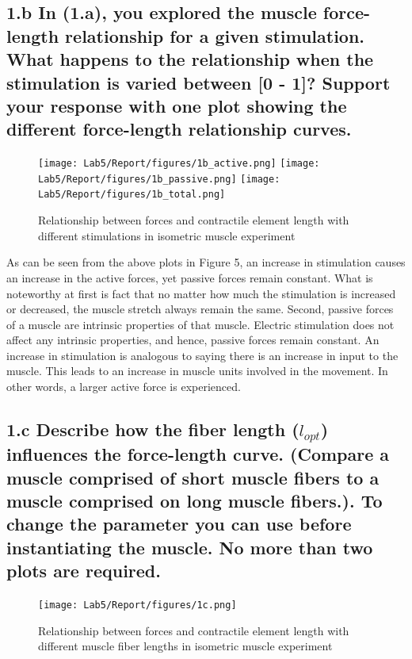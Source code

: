 \documentclass{cmc}
\begin{document}
\subsection*{1.b In (1.a), you explored the muscle force-length
  relationship for a given stimulation. What happens to the
  relationship when the stimulation is varied between [0 - 1]? Support
  your response with one plot showing the different force-length
  relationship curves.}
  \begin{figure}[H]
  \centering 
  \texttt{[image: Lab5/Report/figures/1b\_active.png]}
  \texttt{[image: Lab5/Report/figures/1b\_passive.png]}
  \texttt{[image: Lab5/Report/figures/1b\_total.png]}
  \caption{Relationship between forces and contractile element length with different stimulations in isometric muscle experiment }
  \label{1b}
\end{figure}
  
As can be seen from the above plots in Figure 5, an increase in stimulation causes an increase in the active forces, yet passive forces remain constant. What is noteworthy at first is fact that no matter how much the stimulation is increased or decreased, the muscle stretch always remain the same. Second, passive forces of a muscle are intrinsic properties of that muscle. Electric stimulation does not affect any intrinsic properties, and hence, passive forces remain constant. An increase in stimulation is analogous to saying there is an increase in input to the muscle. This leads to an increase in muscle units involved in the movement. In other words, a larger active force is experienced.  

\subsection*{1.c Describe how the fiber length ($l_{opt}$) influences
  the force-length curve.  (Compare a muscle comprised of short muscle
  fibers to a muscle comprised on long muscle fibers.). To change the
  parameter you can use
   before
  instantiating the muscle. No more than two plots are required. }

  \begin{figure}[H]
  \centering 
  \texttt{[image: Lab5/Report/figures/1c.png]}
  \caption{Relationship between forces and contractile element length with different muscle fiber lengths in isometric muscle experiment}
  \label{1c}
\end{figure}
\end{document}
